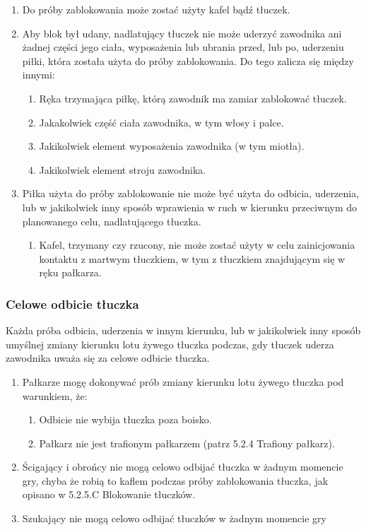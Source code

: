 \documentclass[12pt]{article}
\begin{document}
\begin{enumerate}
\item
  Do próby zablokowania może zostać użyty kafel bądź tłuczek.
\item
  Aby blok był udany, nadlatujący tłuczek nie może uderzyć zawodnika ani
  żadnej części jego ciała, wyposażenia lub ubrania przed, lub po,
  uderzeniu piłki, która została użyta do próby zablokowania. Do tego
  zalicza się między innymi:

  \begin{enumerate}
  \item
        Ręka trzymająca piłkę, którą zawodnik ma zamiar zablokować tłuczek.
      \item
        Jakakolwiek część ciała zawodnika, w tym włosy i palce.
      \item
        Jakikolwiek element wyposażenia zawodnika (w tym miotła).
      \item
        Jakikolwiek element stroju zawodnika.
      \end{enumerate}
\item
  Piłka użyta do próby zablokowanie nie może być użyta do odbicia,
  uderzenia, lub w jakikolwiek inny sposób wprawienia w ruch w kierunku
  przeciwnym do planowanego celu, nadlatującego tłuczka.

  \begin{enumerate}
  \item
        Kafel, trzymany czy rzucony, nie może zostać użyty w celu
    zainicjowania kontaktu z martwym tłuczkiem, w tym z tłuczkiem
    znajdującym się w ręku pałkarza.
      \end{enumerate}
\end{enumerate}

\subsubsection{Celowe odbicie tłuczka}

Każda próba odbicia, uderzenia w innym kierunku, lub w jakikolwiek inny
sposób umyślnej zmiany kierunku lotu żywego tłuczka podczas, gdy tłuczek
uderza zawodnika uważa się za celowe odbicie tłuczka.

\begin{enumerate}
\item
  Pałkarze mogę dokonywać prób zmiany kierunku lotu żywego tłuczka pod
  warunkiem, że:

  \begin{enumerate}
  \item
        Odbicie nie wybija tłuczka poza boisko.
      \item
        Pałkarz nie jest trafionym pałkarzem (patrz 5.2.4 Trafiony pałkarz).
      \end{enumerate}
\item
    Ścigający i obrońcy nie mogą celowo odbijać tłuczka w żadnym momencie
  gry, chyba że robią to kaflem podczas próby zablokowania tłuczka, jak
  opisano w 5.2.5.C Blokowanie tłuczków.
  \item
    Szukający nie mogą celowo odbijać tłuczków w żadnym momencie gry
  \end{enumerate}
\end{document}
